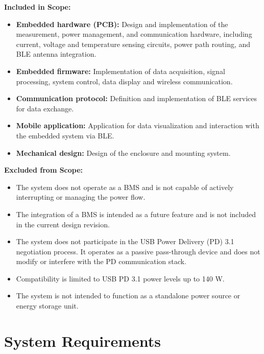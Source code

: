 \textbf{Included in Scope:}
\begin{itemize}
    \item \textbf{Embedded hardware (PCB):} Design and implementation of the measurement, power management, and communication hardware, including current, voltage and temperature sensing circuits, power path routing, and BLE antenna integration.

    \item \textbf{Embedded firmware:} Implementation of data acquisition, signal processing, system control, data display and wireless communication.

    \item \textbf{Communication protocol:} Definition and implementation of BLE services for data exchange.

    \item \textbf{Mobile application:} Application for data visualization and interaction with the embedded system via BLE.

    \item \textbf{Mechanical design:} Design of the enclosure and mounting system.
\end{itemize}

\textbf{Excluded from Scope:} 
\begin{itemize}
    \item The system does not operate as a BMS and is not capable of actively interrupting or managing the power flow.
    \item The integration of a BMS is intended as a future feature and is not included in the current design revision.
    \item The system does not participate in the USB Power Delivery (PD) 3.1 negotiation process. It operates as a passive pass-through device and does not modify or interfere with the PD communication stack. 
    \item Compatibility is limited to USB PD 3.1 power levels up to 140 W.
    \item The system is not intended to function as a standalone power source or energy storage unit.
\end{itemize}

\newpage
\section{System Requirements}\label{sec:system_requirements}

